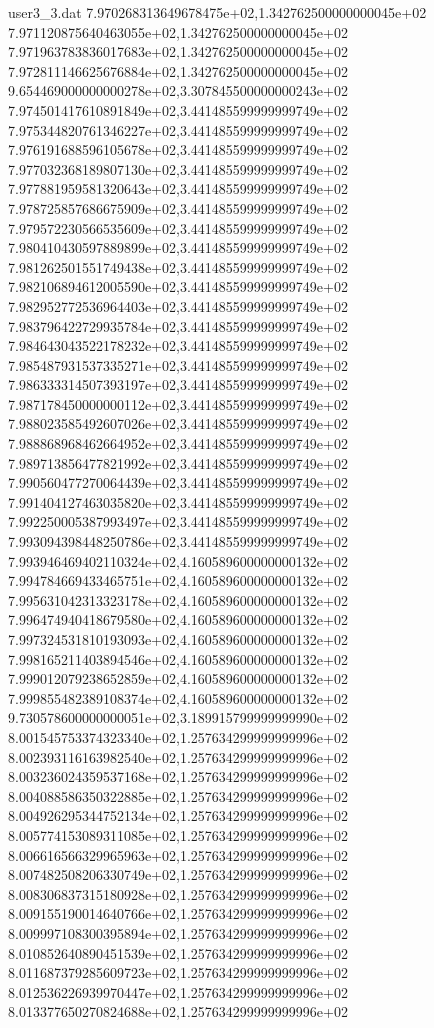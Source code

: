 \begin{filecontents}{user3_3.dat}
7.970268313649678475e+02,1.342762500000000045e+02
7.971120875640463055e+02,1.342762500000000045e+02
7.971963783836017683e+02,1.342762500000000045e+02
7.972811146625676884e+02,1.342762500000000045e+02
9.654469000000000278e+02,3.307845500000000243e+02
7.974501417610891849e+02,3.441485599999999749e+02
7.975344820761346227e+02,3.441485599999999749e+02
7.976191688596105678e+02,3.441485599999999749e+02
7.977032368189807130e+02,3.441485599999999749e+02
7.977881959581320643e+02,3.441485599999999749e+02
7.978725857686675909e+02,3.441485599999999749e+02
7.979572230566535609e+02,3.441485599999999749e+02
7.980410430597889899e+02,3.441485599999999749e+02
7.981262501551749438e+02,3.441485599999999749e+02
7.982106894612005590e+02,3.441485599999999749e+02
7.982952772536964403e+02,3.441485599999999749e+02
7.983796422729935784e+02,3.441485599999999749e+02
7.984643043522178232e+02,3.441485599999999749e+02
7.985487931537335271e+02,3.441485599999999749e+02
7.986333314507393197e+02,3.441485599999999749e+02
7.987178450000000112e+02,3.441485599999999749e+02
7.988023585492607026e+02,3.441485599999999749e+02
7.988868968462664952e+02,3.441485599999999749e+02
7.989713856477821992e+02,3.441485599999999749e+02
7.990560477270064439e+02,3.441485599999999749e+02
7.991404127463035820e+02,3.441485599999999749e+02
7.992250005387993497e+02,3.441485599999999749e+02
7.993094398448250786e+02,3.441485599999999749e+02
7.993946469402110324e+02,4.160589600000000132e+02
7.994784669433465751e+02,4.160589600000000132e+02
7.995631042313323178e+02,4.160589600000000132e+02
7.996474940418679580e+02,4.160589600000000132e+02
7.997324531810193093e+02,4.160589600000000132e+02
7.998165211403894546e+02,4.160589600000000132e+02
7.999012079238652859e+02,4.160589600000000132e+02
7.999855482389108374e+02,4.160589600000000132e+02
9.730578600000000051e+02,3.189915799999999990e+02
8.001545753374323340e+02,1.257634299999999996e+02
8.002393116163982540e+02,1.257634299999999996e+02
8.003236024359537168e+02,1.257634299999999996e+02
8.004088586350322885e+02,1.257634299999999996e+02
8.004926295344752134e+02,1.257634299999999996e+02
8.005774153089311085e+02,1.257634299999999996e+02
8.006616566329965963e+02,1.257634299999999996e+02
8.007482508206330749e+02,1.257634299999999996e+02
8.008306837315180928e+02,1.257634299999999996e+02
8.009155190014640766e+02,1.257634299999999996e+02
8.009997108300395894e+02,1.257634299999999996e+02
8.010852640890451539e+02,1.257634299999999996e+02
8.011687379285609723e+02,1.257634299999999996e+02
8.012536226939970447e+02,1.257634299999999996e+02
8.013377650270824688e+02,1.257634299999999996e+02

\end{filecontents}
